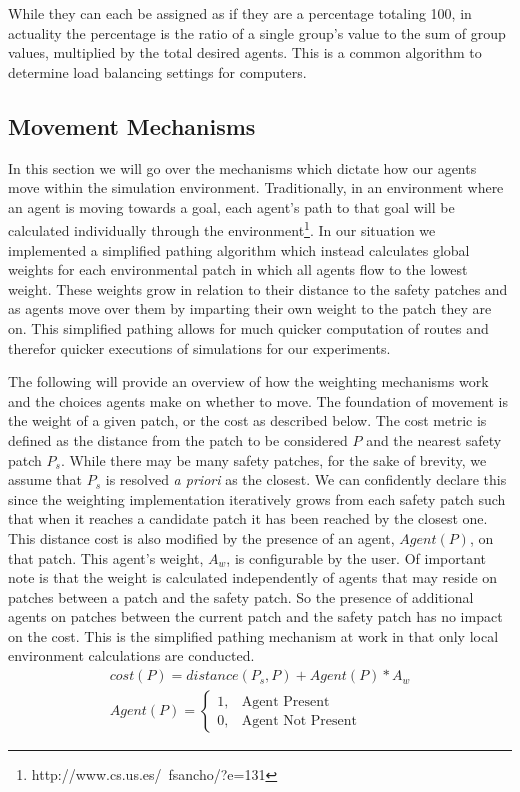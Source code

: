 \documentclass[12pt,letterpaper]{article}
\begin{document}
While they can each be assigned as if they are a percentage totaling 100, in actuality the percentage is the ratio of a single group's value to the sum of group values, multiplied by the total desired agents.  This is a common algorithm to determine load balancing settings for computers.


\subsection{Movement Mechanisms} \label{move}
In this section we will go over the mechanisms which dictate how our agents move within the simulation environment.  Traditionally, in an environment where an agent is moving towards a goal, each agent's path to that goal will be calculated individually through the environment\footnote{http://www.cs.us.es/~fsancho/?e=131}.  In our situation we implemented a simplified pathing algorithm which instead calculates global weights for each environmental patch in which all agents flow to the lowest weight.  These weights grow in relation to their distance to the safety patches and as agents move over them by imparting their own weight to the patch they are on.  This simplified pathing allows for much quicker computation of routes and therefor quicker executions of simulations for our experiments.

The following will provide an overview of how the weighting mechanisms work and the choices agents make on whether to move.  The foundation of movement is the weight of a given patch, or the cost as described below. The cost metric is defined as the distance from the patch to be considered $P$ and the nearest safety patch $P_s$.  While there may be many safety patches, for the sake of brevity, we assume that $P_s$ is resolved \emph{a priori} as the closest.  We can confidently declare this since the weighting implementation iteratively grows from each safety patch such that when it reaches a candidate patch it has been reached by the closest one.  This distance cost is also modified by the presence of an agent, $Agent(P)$, on that patch.  This agent's weight, $A_w$, is configurable by the user.  Of important note is that the weight is calculated independently of agents that may reside on patches between a patch and the safety patch.  So the presence of additional agents on patches between the current patch and the safety patch has no impact on the cost.  This is the simplified pathing mechanism at work in that only local environment calculations are conducted.
\begin{align}
cost(P)  = distance(P_s, P) + Agent(P) * A_w \nonumber \\
Agent(P)=
\begin{cases}
1, & \text{Agent Present}  \\
0, & \text{Agent Not Present} 
\end{cases}
\end{align}
\end{document}
